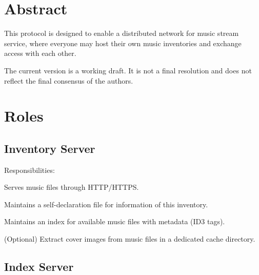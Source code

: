 \documentclass[a4paper,11pt]{article}
\begin{document}
\fulldoctitle






\section*{Abstract}

This protocol is designed to enable a distributed network for music stream service,
where everyone may host their own music inventories and exchange access with each other.

The current version is a working draft. It is not a final resolution and does not reflect the final consensus of the authors.










\Nmaketoc\clearpage












\section{Roles}



\subsection{Inventory Server}

Responsibilities:

\begin{compactitem}
	\item Serves music files through HTTP/HTTPS.
	\item Maintains a self-declaration file for information of this inventory.
	\item Maintains an index for available music files with metadata (ID3 tags).
	\item (Optional) Extract cover images from music files in a dedicated cache directory.
\end{compactitem}



\subsection{Index Server}
\end{document}
